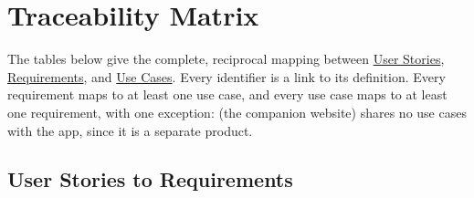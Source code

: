 \chapter{Traceability Matrix}

\noindent The tables below give the complete, reciprocal mapping between \hyperref[Chapter:UserStories]{User Stories}, \hyperref[Chapter:Requirements]{Requirements}, and \hyperref[Chapter:UseCases]{Use Cases}. Every identifier is a link to its definition. Every requirement maps to at least one use case, and every use case maps to at least one requirement, with one exception:  (the companion website) shares no use cases with the app, since it is a separate product.

\section{User Stories to Requirements}

